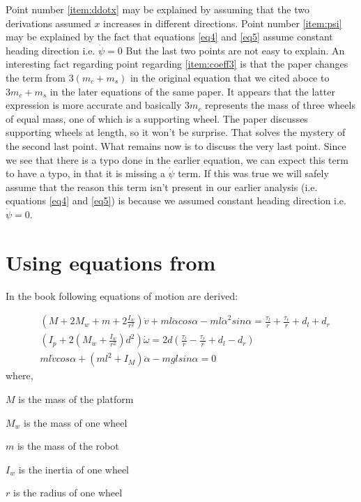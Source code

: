\documentclass[a4paper,10pt]{article}
\begin{document}
 Point number \ref{item:ddotx} may be explained by assuming that the two derivations assumed $x$ increases in different directions.
Point number \ref{item:psi} may be explained by the fact that equations \ref{eq4} and \ref{eq5} assume constant heading direction i.e. $\dot\psi=0$
But the last two points are not easy to explain. An interesting fact regarding point regarding \ref{item:coeff3} is that the paper \cite{kim2005dynamic}
changes the term from $3(m_c+m_s)$ in the original equation that we cited aboce to $3m_c+m_s$ in the later equations of the same paper. It appears that
the latter expression is more accurate and basically $3m_c$ represents the mass of three wheels of equal mass, one of which is a supporting wheel.
The paper discusses supporting wheels at length, so it won't be surprise. That solves the mystery of the second last point. What remains now is to
discuss the very last point. Since we see that there is a typo done in the earlier equation, we can expect this term to have a typo, in that it
is missing a $\dot\psi$ term. If this was true we will safely assume that the reason this term isn't present in our earlier analysis (i.e. equations 
\ref{eq4} and \ref{eq5}) is because we assumed constant heading direction i.e. $\dot{\psi}=0$.

\section{Using equations from \cite{li2012advanced}}
In the book \cite{li2012advanced} following equations of motion are derived:

\begin{align}
 &\left(M+2M_w+m+2\frac{I_w}{r^2}\right)\dot{v}+ml\ddot{\alpha}cos\alpha-ml{\dot{\alpha}}^2sin\alpha = \frac{\tau_l}{r}+\frac{\tau_r}{r}+d_l+d_r \label{eq9} \\
 &\left(I_p+2\left(M_w+\frac{I_w}{r^2}\right)d^2\right)\dot{\omega}=2d\left(\frac{\tau_l}{r}-\frac{\tau_r}{r}+d_l-d_r\right) \label{eq10} \\
 &ml\dot{v}cos\alpha+\left(ml^2+I_M\right)\ddot{\alpha}-mglsin\alpha=0 \label{eq11}
\end{align} where,

$M$ is the mass of the platform

$M_w$ is the mass of one wheel	

$m$ is the mass of the robot

$I_w$ is the inertia of one wheel

$r$ is the radius of one wheel
\end{document}
